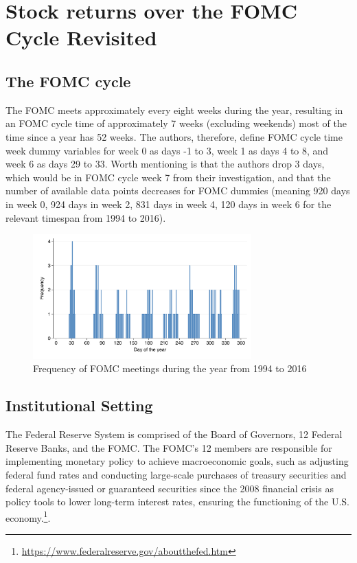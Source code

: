 \chapter{Stock returns over the FOMC Cycle Revisited }


\section{The FOMC cycle}

The FOMC meets approximately every eight weeks during the year,  resulting in an FOMC cycle time of approximately 7 weeks (excluding weekends) most of the time since a year has 52 weeks. The authors, therefore, define FOMC cycle time week dummy variables for week 0 as days -1 to 3, week 1 as days 4 to 8, and week 6 as days 29 to 33. Worth mentioning is that the authors drop 3 days, which would be in FOMC cycle week 7 from their investigation, and that the number of available data points decreases for FOMC dummies (meaning 920 days in week 0,  924 days in week 2,  831 days in week 4,  120 days in week 6 for the relevant timespan from 1994 to 2016).

\label{cies19_fig2}
\begin{figure}[h]
    \centering
    \includegraphics[width=0.75\textwidth]{figures/cies19/fig2}
    \caption{Frequency of FOMC meetings during the year from 1994 to 2016 \parencite{cieslak_stock_2019}}
\end{figure}


\section{Institutional Setting}

The Federal Reserve System is comprised of the Board of Governors, 12 Federal Reserve Banks, and the FOMC. The FOMC's 12 members are responsible for implementing monetary policy to achieve macroeconomic goals, such as adjusting federal fund rates and conducting large-scale purchases of treasury securities and federal agency-issued or guaranteed securities since the 2008 financial crisis as policy tools to lower long-term interest rates, ensuring the functioning of the U.S. economy.\footnote{\url{https://www.federalreserve.gov/aboutthefed.htm}}. 

